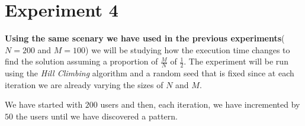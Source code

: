 \documentclass[12]{article}
\begin{document}
%
%
%            



\section{Experiment 4}
\textbf{Using the same scenary we have used in the previous experiments}($N=200$ and $M=100$) we will be studying how the execution time changes to find the solution  assuming a proportion of $\frac{M}{N}$ of $\frac{1}{2}$. The experiment will be run using the     
 \textit{Hill Climbing} algorithm and a random seed that is fixed since at each iteration we are already varying the sizes of $N$ and $M$.

We have started with $200$ users and then, each iteration, we have incremented by $50$ the users until we have discovered a pattern.  
\end{document}
